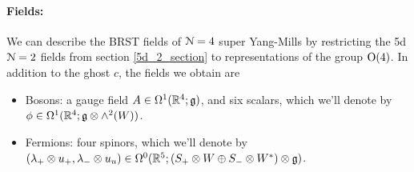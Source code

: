 \documentclass[10pt, oneside]{article}
\begin{document}
\vspace{-10pt}
\paragraph{Fields:} We can describe the BRST fields of $\mathcal{N}=4$ super Yang-Mills by restricting the 5d $\mathcal{N}=2$ fields from section \ref{5d_2_section} to representations of the group $\mathrm{O}(4)$.  In addition to the ghost $c$, the fields we obtain are
\begin{itemize}
 \item Bosons: a gauge field $A \in \Omega^1(\mathbb R^4; \mathfrak{g})$, and six scalars, which we'll denote by $\phi \in \Omega^1(\mathbb R^4; \mathfrak{g} \otimes \wedge^2(W))$.
 \item Fermions: four spinors, which we'll denote by $(\lambda_+ \otimes u_+, \lambda_- \otimes u_u) \in \Omega^0(\mathbb R^5; (S_+ \otimes W \oplus S_- \otimes W^*) \otimes \mathfrak{g})$.
\end{itemize}

\vspace{-10pt}
\end{document}
